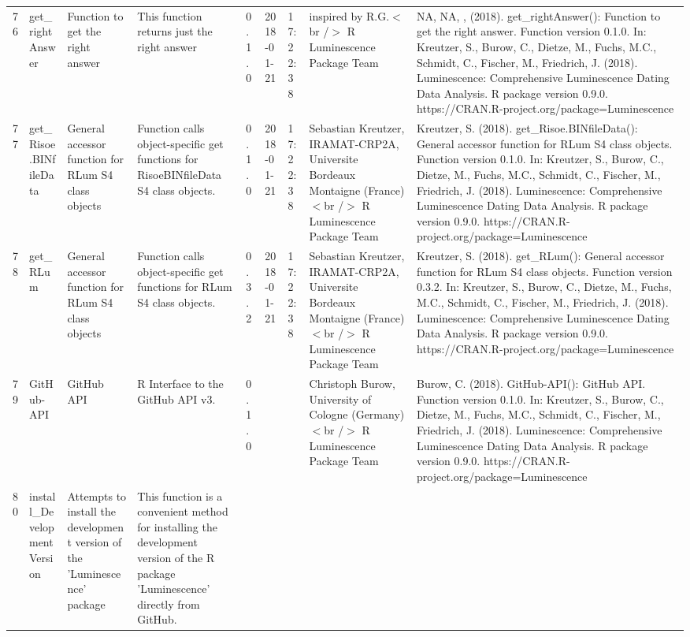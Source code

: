 \begin{table}[ht]
\begin{tabular}{rllllllll}
 \\ 
  76 & get\_rightAnswer & Function to get the right answer & This function returns just the right answer & 0.1.0 & 2018-01-21 & 17:22:38
 & inspired by R.G.$<$br /$>$  R Luminescence Package Team & NA, NA, ,  (2018). get\_rightAnswer(): Function to get the right answer. Function version 0.1.0. In: Kreutzer, S., Burow, C., Dietze, M., Fuchs, M.C., Schmidt, C., Fischer, M., Friedrich, J. (2018). Luminescence: Comprehensive Luminescence Dating Data Analysis. R package version 0.9.0. https://CRAN.R-project.org/package=Luminescence
 \\ 
  77 & get\_Risoe.BINfileData & General accessor function for RLum S4 class objects & Function calls object-specific get functions for RisoeBINfileData S4 class objects. & 0.1.0 & 2018-01-21 & 17:22:38
 & Sebastian Kreutzer, IRAMAT-CRP2A, Universite Bordeaux Montaigne (France)$<$br /$>$  R Luminescence Package Team & Kreutzer, S. (2018). get\_Risoe.BINfileData(): General accessor function for RLum S4 class objects. Function version 0.1.0. In: Kreutzer, S., Burow, C., Dietze, M., Fuchs, M.C., Schmidt, C., Fischer, M., Friedrich, J. (2018). Luminescence: Comprehensive Luminescence Dating Data Analysis. R package version 0.9.0. https://CRAN.R-project.org/package=Luminescence
 \\ 
  78 & get\_RLum & General accessor function for RLum S4 class objects & Function calls object-specific get functions for RLum S4 class objects. & 0.3.2 & 2018-01-21 & 17:22:38
 & Sebastian Kreutzer, IRAMAT-CRP2A, Universite Bordeaux Montaigne (France)$<$br /$>$  R Luminescence Package Team & Kreutzer, S. (2018). get\_RLum(): General accessor function for RLum S4 class objects. Function version 0.3.2. In: Kreutzer, S., Burow, C., Dietze, M., Fuchs, M.C., Schmidt, C., Fischer, M., Friedrich, J. (2018). Luminescence: Comprehensive Luminescence Dating Data Analysis. R package version 0.9.0. https://CRAN.R-project.org/package=Luminescence
 \\ 
  79 & GitHub-API & GitHub API & R Interface to the GitHub API v3. & 0.1.0
 &  &  & Christoph Burow, University of Cologne (Germany)$<$br /$>$  R Luminescence Package Team & Burow, C. (2018). GitHub-API(): GitHub API. Function version 0.1.0. In: Kreutzer, S., Burow, C., Dietze, M., Fuchs, M.C., Schmidt, C., Fischer, M., Friedrich, J. (2018). Luminescence: Comprehensive Luminescence Dating Data Analysis. R package version 0.9.0. https://CRAN.R-project.org/package=Luminescence
 \\ 
  80 & install\_DevelopmentVersion & Attempts to install the development version of the 'Luminescence' package & This function is a convenient method for installing the development version of the R package 'Luminescence' directly from GitHub. &  &  &  &  &  \\ 

\end{tabular}
\end{table}

